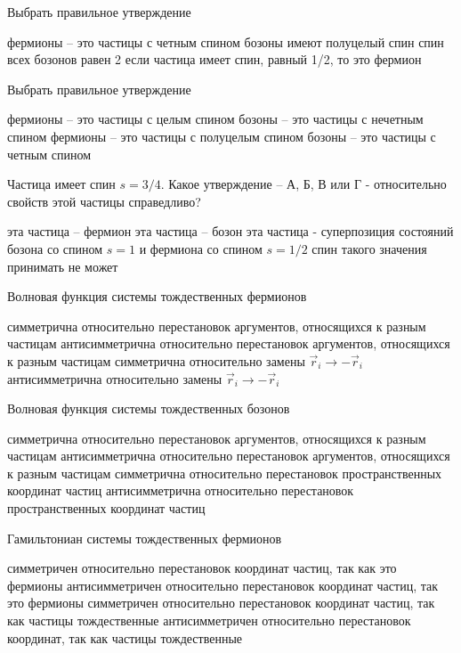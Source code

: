 \documentclass[11pt,a4paper]{exam}
\begin{document}
\begin{questions}

\question Выбрать правильное утверждение
\begin{choices}
\choice фермионы – это частицы с четным спином
\choice бозоны имеют полуцелый спин
\choice спин всех бозонов равен 2
\choice если частица имеет спин, равный 1/2, то это фермион
\end{choices}

\question Выбрать правильное утверждение
\begin{choices}
\choice фермионы – это частицы с целым спином
\choice бозоны – это частицы с нечетным спином
\choice фермионы – это частицы с полуцелым спином
\choice бозоны – это частицы с четным спином
\end{choices}

\question Частица имеет спин $s = 3/4$. Какое утверждение – А, Б, В или Г - относительно свойств этой частицы справедливо?
\begin{choices}
\choice эта частица – фермион
\choice эта частица – бозон
\choice эта частица - суперпозиция состояний бозона со спином $s = 1$ и фермиона со спином $s = 1/2$
\choice спин такого значения принимать не может
\end{choices}

\question Волновая функция системы тождественных фермионов 
\begin{choices}
\choice симметрична относительно перестановок аргументов, относящихся к разным частицам
\choice антисимметрична относительно перестановок аргументов, относящихся к разным частицам
\choice симметрична относительно замены ${\vec r_i} \to  - {\vec r_i}$
\choice антисимметрична относительно замены ${\vec r_i} \to  - {\vec r_i}$
\end{choices}

\question Волновая функция системы тождественных бозонов
\begin{choices}
\choice симметрична относительно перестановок аргументов, относящихся к разным частицам
\choice антисимметрична относительно перестановок аргументов, относящихся к разным частицам
\choice симметрична относительно перестановок пространственных координат частиц
\choice антисимметрична относительно перестановок пространственных координат частиц
\end{choices}

\question Гамильтониан системы тождественных фермионов
\begin{choices}
\choice симметричен относительно перестановок координат частиц, так как это фермионы
\choice антисимметричен относительно перестановок координат частиц, так это фермионы
\choice симметричен относительно перестановок координат частиц, так как частицы тождественные
\choice антисимметричен относительно перестановок координат, так как частицы тождественные
\end{choices}


\end{questions}
\end{document}
